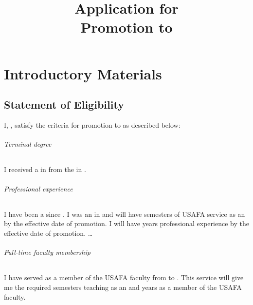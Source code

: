\documentclass[11pt,openany,oneside]{book}
\title{Application for\\Promotion to \meta{Academic Rank}}
\author{\meta{Applicant Name}}
\date{\meta{Semester of Application}}
\begin{document}
\maketitle

\frontmatter
\tableofcontents


\mainmatter

\part{Introductory Materials}\label{part:introduction}  %

\chapter{Statement of Eligibility}\label{section:eligibility}  %

I, , satisfy the criteria for promotion to  as described below:

\paragraph{Terminal degree}
I received a  in  from the  in .

\paragraph{Professional experience}
I have been a  since .
I was  an  in  and will have  semesters of \gls{USAFA} service as an  by the effective date of promotion.
I will have  years professional experience by the effective date of promotion.
\dots

\paragraph{Full-time faculty membership}
I have served as a member of the \gls{USAFA} faculty from  to .
This service will give me the required  semesters teaching as an  and  years as a member of the \gls{USAFA} faculty.
\end{document}
